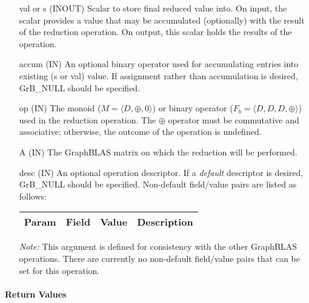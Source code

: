 \begin{itemize}[leftmargin=1.1in]
    \item[{\sf val} or {\sf s}] ({\sf INOUT}) Scalar to store final reduced value into. On input,
    the scalar provides a value that may be accumulated (optionally) with the result of the
    reduction operation.  On output, this scalar holds the results of the
    operation.

    \item[{\sf accum}] ({\sf IN}) An optional binary operator used for accumulating
    entries into existing  ({\sf s} or {\sf val})  value. If assignment rather than accumulation is
    desired, {\sf GrB\_NULL} should be specified.

    \item[{\sf op}]    ({\sf IN}) The monoid ($M = \langle D,\oplus,0 \rangle$) or binary operator 
    ($F_b = \langle D, D, D, \oplus \rangle$) used in the reduction operation. The $\oplus$ operator 
    must be commutative and associative; otherwise, the outcome of the operation is undefined.  
    
    \item[{\sf A}]     ({\sf IN}) The GraphBLAS matrix on which the
    reduction will be performed.

    \item[{\sf desc}] ({\sf IN}) An optional operation descriptor. If
    a \emph{default} descriptor is desired, {\sf GrB\_NULL} should be
    specified. Non-default field/value pairs are listed as follows:  \\

    \begin{tabular}{lllp{2.5in}}
        Param & Field  & Value & Description \\
        \hline
    \end{tabular}

    \emph{Note:} This argument is defined for consistency with the other GraphBLAS operations.
    There are currently no non-default field/value pairs that can be set for this operation.
\end{itemize}

\paragraph{Return Values}

